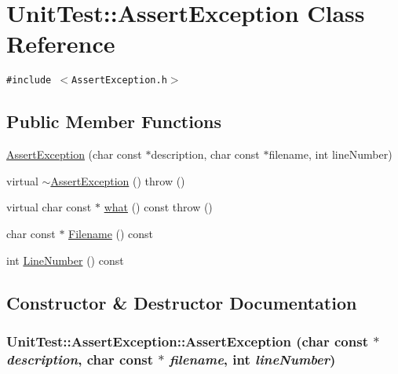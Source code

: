 \hypertarget{class_unit_test_1_1_assert_exception}{
\section{UnitTest::AssertException Class Reference}
\label{class_unit_test_1_1_assert_exception}
}
{\tt \#include $<$AssertException.h$>$}

\subsection*{Public Member Functions}
\begin{CompactItemize}
\item 
\hyperlink{class_unit_test_1_1_assert_exception_3fde2eb7e5dd69ebbcb3bd781ab4221a}{AssertException} (char const $\ast$description, char const $\ast$filename, int lineNumber)
\item 
virtual \hyperlink{class_unit_test_1_1_assert_exception_6e4d995dd718aa09b7e405cd7a0dbc7b}{$\sim$AssertException} ()  throw ()
\item 
virtual char const $\ast$ \hyperlink{class_unit_test_1_1_assert_exception_f7b481e06592e0c186629048fccc1ce9}{what} () const   throw ()
\item 
char const $\ast$ \hyperlink{class_unit_test_1_1_assert_exception_48f1f3e218b14a584fef01ba0bf783af}{Filename} () const 
\item 
int \hyperlink{class_unit_test_1_1_assert_exception_f94e4817bb3ee0af0f53520738a08545}{LineNumber} () const 
\end{CompactItemize}


\subsection{Constructor \& Destructor Documentation}
\hypertarget{class_unit_test_1_1_assert_exception_3fde2eb7e5dd69ebbcb3bd781ab4221a}{
\subsubsection[{AssertException}]{\setlength{\rightskip}{0pt plus 5cm}UnitTest::AssertException::AssertException (char const $\ast$ {\em description}, \/  char const $\ast$ {\em filename}, \/  int {\em lineNumber})}}
\label{class_unit_test_1_1_assert_exception_3fde2eb7e5dd69ebbcb3bd781ab4221a}


